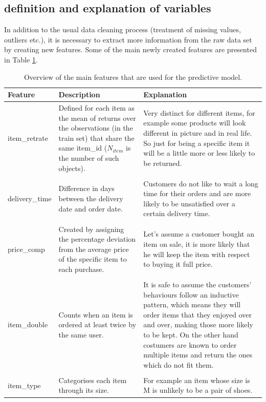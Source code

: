 \documentclass[a4paper,12pt]{article}
\begin{document}
 \subsection{definition and explanation of variables }\label{Subsec::variables}
In addition to the usual data cleaning process (treatment of missing values, outliers etc.), it is necessary to extract more information from the raw data set by creating new features. Some of the main newly created features are presented in Table \ref{Table::Features}.
\begin{table}[h]
\begin{tabular}{|l p{6.5cm} p{6.5cm}|}
\hline
\textbf{Feature} & \textbf{Description} & \textbf{Explanation} \\
\hline \hline
item\_retrate 
& Defined for each item as  the mean of returns over the observations (in the train set) that share the same item\_id ($N_{item}$ is the number of such objects).
& Very distinct for different items, for example some  products will look different       in picture and in real life. So just for being a specific item   it will be a little more or less likely  to be returned. \\
& & \\
delivery\_time 
& Difference in days between the delivery date and order date.
& Customers do not like to wait a  long time for their orders and  are more likely to be unsatisfied  over a certain delivery time.  \\
& & \\
price\_comp
& Created by assigning the percentage deviation from the average price of the specific item to each purchase. 
& Let's assume a customer bought an item on sale, it is more likely that he will keep the item with respect to buying it full price. \\
& & \\
item\_double
& Counts when an item is ordered  at least twice by the same user.
& It is safe to assume the customers' behaviours follow an inductive pattern, which means they will  order items that they enjoyed over and over, making those more likely to be kept. On the other hand costumers are known to order multiple items and return the ones which do not fit them.  \\
& & \\
item\_type
& Categorises each item through its size. 
& For example an item whose size is M is unlikely to be a pair of shoes.  \\ 
\hline
\end{tabular}

\caption{Overview of the main features that are used for the predictive model.}
\label{Table::Features}
\end{table}
\end{document}
